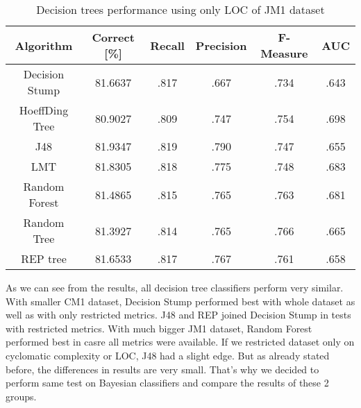 \begin{table}[h!]
\centering
\begin{tabular}{ |c|c|c|c|c|c| } 
 \hline
 \textbf{Algorithm} & \textbf{Correct [\%]} & \textbf{Recall} & \textbf{Precision} & \textbf{F-Measure} & \textbf{AUC}  \\ 
 \hline
 Decision Stump & 81.6637 & .817 & .667 & .734 & .643   \\ 
 \hline
 HoeffDing Tree & 80.9027 & .809 & .747 & .754 & \textcolor{myRed}{.698}   \\ 
 \hline
  J48 & \textcolor{myRed}{81.9347} & \textcolor{myRed}{.819} & \textcolor{myRed}{.790} & .747 & .655   \\ 
 \hline
  LMT & 81.8305 & .818 & .775 & .748 & .683    \\ 
 \hline
  Random Forest & 81.4865 & .815 & .765 & .763 & .681   \\ 
 \hline
 Random Tree  & 81.3927 & .814 & .765 & \textcolor{myRed}{.766} & .665   \\ 
 \hline
 REP tree & 81.6533 & .817 & .767 & .761 & .658   \\ 
 \hline
\end{tabular}
\caption{Decision trees performance using only LOC of JM1 dataset}
\label{table:DT_LOC_JM1}
\end{table}

As we can see from the results, all decision tree classifiers perform very similar. With smaller CM1 dataset, Decision Stump performed best with whole dataset as well as with only restricted metrics. J48 and REP joined Decision Stump in tests with restricted metrics. With  much bigger JM1 dataset, Random Forest performed best in casre all metrics were available. If we restricted dataset only on cyclomatic complexity or LOC, J48 had a slight edge. But as already stated before, the differences in results are very small. That's why we decided to perform same test on Bayesian classifiers and compare the results of these 2 groups.